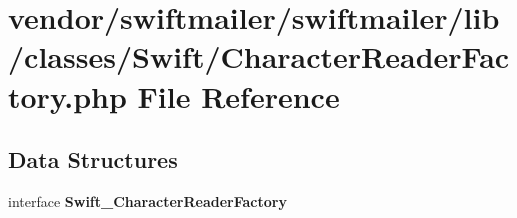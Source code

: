 \section{vendor/swiftmailer/swiftmailer/lib/classes/\+Swift/\+Character\+Reader\+Factory.php File Reference}
\label{_character_reader_factory_8php}
\subsection*{Data Structures}
\begin{DoxyCompactItemize}
\item 
interface {\bf Swift\+\_\+\+Character\+Reader\+Factory}
\end{DoxyCompactItemize}
